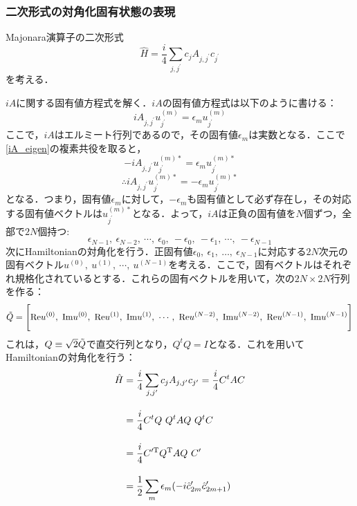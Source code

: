 \documentclass[dvipdfmx,autodetect-engine]{jsarticle}
\newcommand{\nn}{\notag \\}
\begin{document}
\subsubsection{二次形式の対角化固有状態の表現}
Majonara演算子の二次形式
\begin{equation}
    \hat{H}=\frac{i}{4}\sum_{j,j^\prime}
    c_jA_{j,j^\prime}c_{j^\prime}
\end{equation}
を考える．

$iA$に関する固有値方程式を解く．$iA$の固有値方程式は以下のように書ける：
\begin{equation}\label{iA_eigen}
    iA_{j,j^\prime}u^{(m)}_{j^\prime} =\epsilon_m u^{(m)}_{j^\prime}
\end{equation}
ここで，$iA$はエルミート行列であるので，その固有値$\epsilon_m$は実数となる．ここで\eqref{iA_eigen}の複素共役を取ると，
\begin{equation}\label{iA_eigen}
    -iA_{j,j^\prime}u^{(m)\ast}_{j^\prime} =\epsilon_m u^{(m)\ast}_{j^\prime}
\end{equation}
\begin{equation}\label{iA_eigen}
    \therefore iA_{j,j^\prime}u^{(m)\ast}_{j^\prime} =-\epsilon_m u^{(m)\ast}_{j^\prime}
\end{equation}
となる．つまり，固有値$\epsilon_m$に対して，$-\epsilon_m$も固有値として必ず存在し，その対応する固有値ベクトルは$u^{(m)\ast}_{j^\prime}$となる．よって，$iA$は正負の固有値を$N$個ずつ，全部で$2N$個持つ:
\begin{equation}
    \epsilon_{N-1},\ \epsilon_{N-2},\ \cdots,\ \epsilon_{0},\ 
    -\epsilon_{0},\ -\epsilon_{1},\ \cdots,\  -\epsilon_{N-1}
\end{equation}
次にHamiltonianの対角化を行う．正固有値$\epsilon_0,\ \epsilon_1,\ \ldots,\ \epsilon_{N-1}$に対応する$2N$次元の固有ベクトル$u^{(0)},\ u^{(1)},\ \cdots,\ u^{(N-1)}$を考える．ここで，固有ベクトルはそれぞれ規格化されているとする．これらの固有ベクトルを用いて，次の$2N\times2N$行列を作る：
\begin{equation}
    \Tilde{Q} = \Biggl[
    {\rm{Re}}u^{(0)},\ {\rm{Im}}u^{(0)},\ {\rm{Re}}u^{(1)},\ {\rm{Im}}u^{(1)},\ \cdots,\ 
    {\rm{Re}}u^{(N-2)},\ {\rm{Im}}u^{(N-2)},\ {\rm{Re}}u^{(N-1)},\ {\rm{Im}}u^{(N-1)}
    \Biggr]
\end{equation}
これは，$Q\equiv\sqrt{2}\Tilde{Q}$で直交行列となり，$Q^t Q=I$となる．これを用いてHamiltonianの対角化を行う：
\begin{align}
    \hat{H}&=\frac{i}{4}\sum_{j,j^\prime}
    c_jA_{j,j^\prime}c_{j^\prime}
    =\frac{i}{4}
    C^t AC\nn[10pt]
    &=\frac{i}{4}C^t Q\ Q^t A Q\ Q^t C\nn[10pt]
    &=\frac{i}{4}C^{\prime {\rm{T}}} Q^{{\rm{T}}} A Q\ C^{\prime}\nn[10pt]
    &=\frac{1}{2}\sum_{m}\epsilon_m(-i\hat{c}_{2m}^{\prime}\hat{c}_{2m+1}^{\prime})
\end{align}
\end{document}
